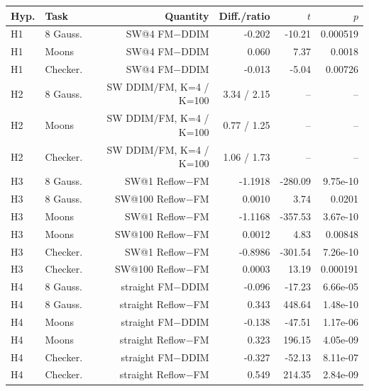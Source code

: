 \begin{tabular}{llrrrr}
\toprule
Hyp. & Task & Quantity & Diff./ratio & $t$ & $p$ \\
\midrule
H1 & 8 Gauss. & SW@4 FM$-$DDIM & -0.202 & -10.21 & 0.000519 \\
H1 & Moons & SW@4 FM$-$DDIM & 0.060 & 7.37 & 0.0018 \\
H1 & Checker. & SW@4 FM$-$DDIM & -0.013 & -5.04 & 0.00726 \\
H2 & 8 Gauss. & SW DDIM/FM, K=4 / K=100 & 3.34 / 2.15 & -- & -- \\
H2 & Moons & SW DDIM/FM, K=4 / K=100 & 0.77 / 1.25 & -- & -- \\
H2 & Checker. & SW DDIM/FM, K=4 / K=100 & 1.06 / 1.73 & -- & -- \\
H3 & 8 Gauss. & SW@1 Reflow$-$FM & -1.1918 & -280.09 & 9.75e-10 \\
H3 & 8 Gauss. & SW@100 Reflow$-$FM & 0.0010 & 3.74 & 0.0201 \\
H3 & Moons & SW@1 Reflow$-$FM & -1.1168 & -357.53 & 3.67e-10 \\
H3 & Moons & SW@100 Reflow$-$FM & 0.0012 & 4.83 & 0.00848 \\
H3 & Checker. & SW@1 Reflow$-$FM & -0.8986 & -301.54 & 7.26e-10 \\
H3 & Checker. & SW@100 Reflow$-$FM & 0.0003 & 13.19 & 0.000191 \\
H4 & 8 Gauss. & straight FM$-$DDIM & -0.096 & -17.23 & 6.66e-05 \\
H4 & 8 Gauss. & straight Reflow$-$FM & 0.343 & 448.64 & 1.48e-10 \\
H4 & Moons & straight FM$-$DDIM & -0.138 & -47.51 & 1.17e-06 \\
H4 & Moons & straight Reflow$-$FM & 0.323 & 196.15 & 4.05e-09 \\
H4 & Checker. & straight FM$-$DDIM & -0.327 & -52.13 & 8.11e-07 \\
H4 & Checker. & straight Reflow$-$FM & 0.549 & 214.35 & 2.84e-09 \\
\bottomrule
\end{tabular}
